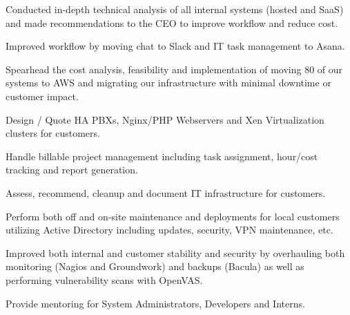 \documentclass[letterpaper]{deedy-resume} %
\begin{document}
\begin{minipage}[t]{0.66\textwidth}
\begin{tightitemize}
\item Conducted in-depth technical analysis of all internal systems (hosted and SaaS) and made recommendations to the CEO to improve workflow and reduce cost.
\item Improved workflow by moving chat to Slack and IT task management to Asana.
\item Spearhead the cost analysis, feasibility and implementation of moving 80 of our systems to AWS and migrating our infrastructure with minimal downtime or customer impact.
\item Design / Quote HA PBXs, Nginx/PHP Webservers and Xen Virtualization clusters for customers.
\item Handle billable project management including task assignment, hour/cost tracking and report generation.
\item Assess, recommend, cleanup and document IT infrastructure for customers.
\item Perform both off and on-site maintenance and deployments for local customers utilizing Active Directory including updates, security, VPN maintenance, etc.
\item Improved both internal and customer stability and security by overhauling both monitoring (Nagios and Groundwork) and backups (Bacula) as well as performing vulnerability scans with OpenVAS.
\item Provide mentoring for System Administrators, Developers and Interns.
\end{tightitemize}




\end{minipage}
\end{document}
